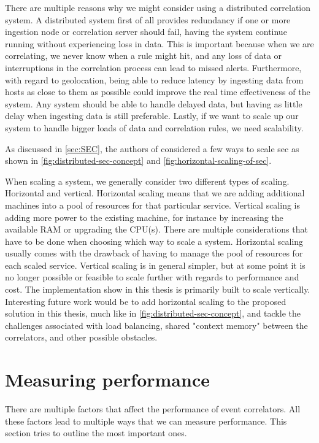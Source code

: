 There are multiple reasons why we might consider using a distributed correlation system. A distributed system first of all provides redundancy if one or more ingestion node or correlation server should fail, having the system continue running without experiencing loss in data. This is important because when we are correlating, we never know when a rule might hit, and any loss of data or interruptions in the correlation process can lead to missed alerts. Furthermore, with regard to geolocation, being able to reduce latency by ingesting data from hosts as close to them as possible could improve the real time effectiveness of the system. Any system should be able to handle delayed data, but having as little delay when ingesting data is still preferable. Lastly, if we want to scale up our system to handle bigger loads of data and correlation rules, we need scalability.

As discussed in \cref{sec:SEC}, the authors of \textcite{sec-distributed} considered a few ways to scale \acrshort{sec} as shown in \cref{fig:distributed-sec-concept} and \cref{fig:horizontal-scaling-of-sec}.

When scaling a system, we generally consider two different types of scaling. Horizontal and vertical. Horizontal scaling means that we are adding additional machines into a pool of resources for that particular service. Vertical scaling is adding more power to the existing machine, for instance by increasing the available RAM or upgrading the CPU(s).
There are multiple considerations that have to be done when choosing which way to scale a system. Horizontal scaling usually comes with the drawback of having to manage the pool of resources for each scaled service. Vertical scaling is in general simpler, but at some point it is no longer possible or feasible to scale further with regards to performance and cost.
The implementation show in this thesis is primarily built to scale vertically.
Interesting future work would be to add horizontal scaling to the proposed solution in this thesis, much like in \cref{fig:distributed-sec-concept}, and tackle the challenges associated with load balancing, shared "context memory" between the correlators, and other possible obstacles.

\section{Measuring performance}
\label{sec:measuring-performance}
There are multiple factors that affect the performance of event correlators. All these factors lead to multiple ways that we can measure performance. This section tries to outline the most important ones.

